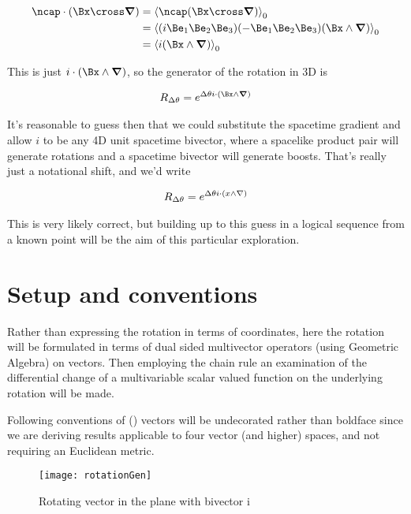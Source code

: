 \begin{align*}
\ncap \cdot (\Bx \cross \spacegrad) 
&=
\gpgradezero{ \ncap (\Bx \cross \spacegrad) } \\
&=
\gpgradezero{ (i \Be_1 \Be_2 \Be_3) (-\Be_1 \Be_2 \Be_3) (\Bx \wedge \spacegrad) } \\
&=
\gpgradezero{ i (\Bx \wedge \spacegrad) } \\
\end{align*}

This is just $i \cdot (\Bx \wedge \spacegrad)$, so the generator of the rotation in 3D is

\begin{align}\label{eqn:rotationGen:goo4}
R_{\Delta\theta} = e^{\Delta\theta i \cdot (\Bx \wedge \spacegrad)}
\end{align}

It's reasonable to guess then that we could substitute the spacetime gradient and allow $i$ to be any 4D unit spacetime bivector, where a spacelike product pair will generate rotations and a spacetime bivector will generate boosts.  That's really just a notational shift, and we'd write

\begin{align}\label{eqn:rotationGen:goo5}
R_{\Delta\theta} = e^{\Delta\theta i \cdot (x \wedge \nabla)}
\end{align}

This is very likely correct, but building up to this guess in a logical sequence from a known point will be the aim of this particular exploration.

\section{Setup and conventions}

Rather than expressing the rotation in terms of coordinates, here the rotation will be formulated in terms of dual sided multivector operators (using Geometric Algebra) on vectors.  Then employing the chain rule an examination of the differential change of a multivariable scalar valued function on the underlying rotation will be made.

Following conventions of (\cite{doran2003gap}) vectors will be undecorated rather than boldface since we are deriving results applicable to four vector (and higher) spaces, and not requiring an Euclidean metric.

\begin{figure}[htp]
\centering
\texttt{[image: rotationGen]}
\caption{Rotating vector in the plane with bivector i}\label{fig:rotationGen:rotationGen}
\end{figure}

